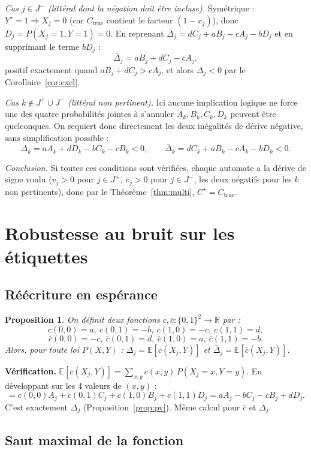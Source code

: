 \documentclass[11pt]{article}
\newtheorem{proposition}{Proposition}
\begin{document}
\textit{Cas $j\in J^-$ (littéral dont la négation doit être incluse).} Symétrique : $Y^\star=1 \Rightarrow X_j=0$ (car $C_{\text{true}}$ contient le facteur $(1-x_j)$), donc $D_j=P(X_j=1,Y=1)=0$. En reprenant $\bar\Delta_j = dC_j+aB_j-cA_j-bD_j$ et en supprimant le terme $bD_j$ :
$$\bar\Delta_j = aB_j+dC_j-cA_j,$$
positif exactement quand $aB_j+dC_j>cA_j$, et alors $\Delta_j<0$ par le Corollaire~\ref{cor:excl}.

\textit{Cas $k \notin J^+\cup J^-$ (littéral non pertinent).} Ici aucune implication logique ne force une des quatre probabilités jointes à s'annuler $A_k,B_k,C_k,D_k$ peuvent être quelconques. On requiert donc directement les deux inégalités de dérive négative, sans simplification possible :
$$\Delta_k = aA_k+dD_k-bC_k-cB_k <0, \qquad \bar\Delta_k = dC_k+aB_k-cA_k-bD_k<0.$$

\textit{Conclusion.} Si toutes ces conditions sont vérifiées, chaque automate a la dérive de signe voulu ($v_j>0$ pour $j\in J^+$, $\bar v_j>0$ pour $j\in J^-$, les deux négatifs pour les $k$ non pertinents), donc par le Théorème~\ref{thm:multi}, $C^\star = C_{\text{true}}$.



\section{Robustesse au bruit sur les étiquettes}

\subsection{Réécriture en espérance}

\begin{proposition}\label{prop:c-func}
On définit deux fonctions $c, \bar c : \{0,1\}^2 \to \mathbb{R}$ par :
$$c(0,0)=a,\ c(0,1)=-b,\ c(1,0)=-c,\ c(1,1)=d,$$
$$\bar c(0,0)=-c,\ \bar c(0,1)=d,\ \bar c(1,0)=a,\ \bar c(1,1)=-b.$$
Alors, pour toute loi $P(X,Y)$ : $\Delta_j = \mathbb{E}[c(X_j,Y)]$ et $\bar\Delta_j = \mathbb{E}[\bar c(X_j,Y)]$.
\end{proposition}

\textbf{Vérification.} $\mathbb{E}[c(X_j,Y)] = \sum_{x,y} c(x,y)\,P(X_j=x,Y=y)$. En développant sur les 4 valeurs de $(x,y)$ :
$$= c(0,0)A_j + c(0,1)C_j + c(1,0)B_j + c(1,1)D_j = aA_j - bC_j - cB_j + dD_j.$$
C'est exactement $\Delta_j$ (Proposition~\ref{prop:pv}). Même calcul pour $\bar c$ et $\bar\Delta_j$.


\subsection{Saut maximal de la fonction}
\end{document}
